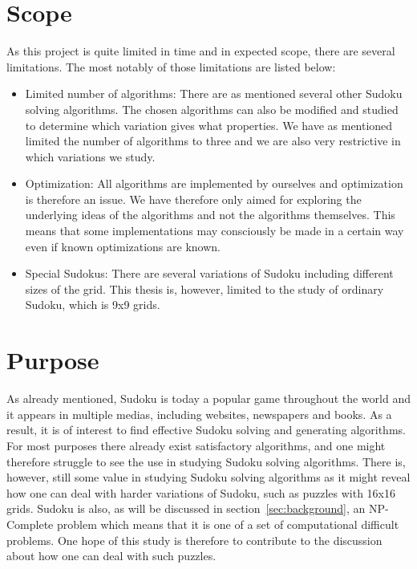 \documentclass[a4paper,11pt]{kth-mag}
\begin{document}
\FloatBarrier
\section{Scope}
As this project is quite limited in time and in expected scope, 
there are several limitations. The most notably of those limitations are listed below: 
\begin{itemize}
    \item Limited number of algorithms:
There are as mentioned several other Sudoku solving algorithms. The chosen algorithms can also be modified and studied to determine which variation gives what properties. We have as mentioned limited the number of algorithms to three and we are also very restrictive in which variations we study.  
    \item Optimization: 
All algorithms are implemented by ourselves and optimization is therefore an issue. 
We have therefore only aimed for exploring the underlying ideas of the algorithms and not the algorithms themselves.
This means that some implementations may consciously be made in a certain way even if known optimizations are known.

    \item Special Sudokus: There are several variations of Sudoku including different sizes of the grid.
This thesis is, however, limited to the study of ordinary Sudoku, which is 9x9 grids.
\end{itemize}

\FloatBarrier
\section{Purpose}
As already mentioned, Sudoku is today a popular game throughout the world and it appears in multiple medias, including websites, newspapers and books. 
As a result, it is of interest to find effective Sudoku solving and generating algorithms. 
For most purposes there already exist satisfactory algorithms, and one might therefore struggle to see the use in studying Sudoku solving algorithms. 
There is, however, still some value in studying Sudoku solving algorithms as it might reveal how one can deal with harder variations of Sudoku, such as puzzles with 16x16 grids. 
Sudoku is also, as will be discussed in section~\ref{sec:background}, an NP-Complete problem which means that it is one of a set of computational difficult problems.\cite{complexity} 
One hope of this study is therefore to contribute to the discussion about how one can deal with such puzzles. 
\end{document}
